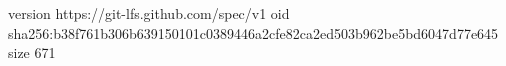 version https://git-lfs.github.com/spec/v1
oid sha256:b38f761b306b639150101c0389446a2cfe82ca2ed503b962be5bd6047d77e645
size 671
